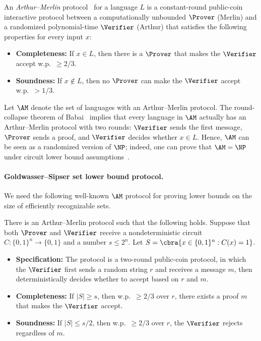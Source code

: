An \emph{Arthur--Merlin} protocol~\cite{Babai85} for a language $L$ is a constant-round public-coin interactive protocol between a computationally unbounded $\Prover$ (Merlin) and a randomized polynomial-time $\Verifier$ (Arthur) that satisfies the following properties for every input $x$:
\begin{itemize}
    \item {\bf Completeness:} If $x\in L$, then there is a $\Prover$ that makes the $\Verifier$ accept w.p.~$\ge 2/3$.
    \item {\bf Soundness:} If $x\not\in L$, then no $\Prover$ can make the $\Verifier$ accept w.p.~$>1/3$.
\end{itemize}

Let $\AM$ denote the set of languages with an Arthur--Merlin protocol. The round-collapse theorem of Babai~\cite{Babai85} implies that every language in $\AM$ actually has an Arthur--Merlin protocol with two rounds: $\Verifier$ sends the first message, $\Prover$ sends a proof, and $\Verifier$ decides whether $x\in L$. Hence, $\AM$ can be seen as a randomized version of $\NP$; indeed, one can prove that $\AM = \NP$ under circuit lower bound assumptions~\cite{KlivansM02, MiltersenV05, ShaltielU05, ShaltielU06}.



\paragraph{Goldwasser--Sipser set lower bound protocol.} We need the following well-known $\AM$ protocol for proving lower bounds on the size of efficiently recognizable sets.
\begin{lemma}\label{lemma:GS-protocol}
There is an Arthur--Merlin protocol such that the following holds. Suppose that both $\Prover$ and $\Verifier$ receive a nondeterministic circuit $C:\{0,1\}^n \to \{0,1\}$ and a number $s\le 2^n$. Let $S=\cbra{x\in \{0,1\}^n : C(x)=1}$.
\begin{itemize}
    \item \textbf{Specification:} The protocol is a two-round public-coin protocol, in which the $\Verifier$ first sends a random string $r$ and receives a message $m$, then deterministically decides whether to accept based on $r$ and $m$.
    \item \textbf{Completeness: }If $|S|\ge s$, then w.p.~$\ge 2/3$ over $r$, there exists a proof $m$ that makes the $\Verifier$ accept.
    \item \textbf{Soundness: }If $|S|\le s/2$, then w.p.~$\ge 2/3$ over $r$, the $\Verifier$ rejects regardless of $m$.
\end{itemize}
\end{lemma}





